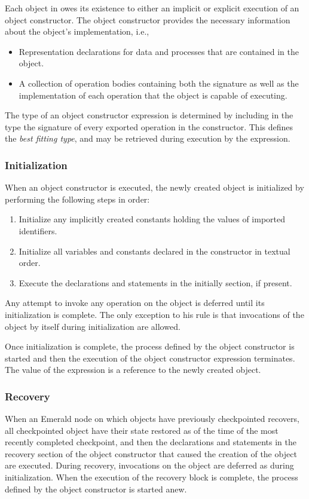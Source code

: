 Each object in \emd{} owes its existence to either an implicit or explicit
execution of an object constructor. The object constructor provides the
necessary information about the object's implementation, i.e.,
\begin{itemize}
\item{} Representation declarations for data and processes that are
contained in the object. 
\item{} A collection of operation bodies containing both the signature as
well as the implementation of each operation that the object is capable of
executing.
\end{itemize}
The type of an object constructor expression is determined by including in
the type the signature of every exported operation in the constructor.  This
defines the {\it 
best fitting type}, and may be retrieved during execution by the 
expression.\label{typeofobjectconstructor}

\subsubsection{Initialization}
When an object constructor is executed, the newly created object is
initialized by performing the following steps in order:
\begin{enumerate}
  \item{} Initialize any implicitly created constants holding the values
    of imported identifiers.
  \item{} Initialize all variables and constants declared in the constructor
    in textual order.
  \item{} Execute the declarations and statements in the initially section,
    if present.
\end{enumerate}
Any attempt to invoke any operation on the object is deferred until
its initialization is complete.  The only exception to his rule is that
invocations of the object by itself during initialization are allowed.

Once initialization is complete, the process defined by the object
constructor is started and then the execution of the object constructor
expression terminates.  The value of the expression is a reference to the
newly created object.  

\subsubsection{Recovery}
When an Emerald node on which objects have previously checkpointed recovers,
all checkpointed object have their state restored as of the time of the most
recently completed checkpoint, and then the declarations and statements in
the recovery section of the object constructor that caused the creation of
the object are executed.  During recovery, invocations on the object are
deferred as during initialization.  When the execution of the recovery block
is complete, the process defined by the object constructor is started anew.

